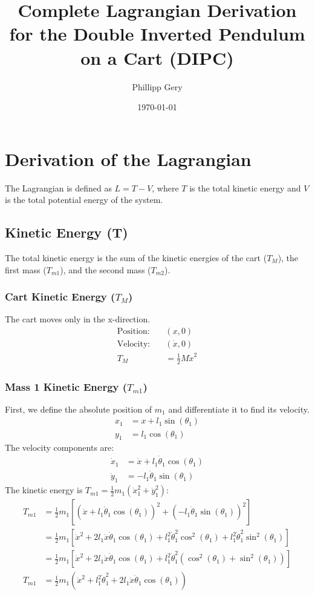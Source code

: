 \documentclass[12pt]{article}
\title{Complete Lagrangian Derivation for the Double Inverted Pendulum on a Cart (DIPC)}
\author{Phillipp Gery}
\date{\today}
\begin{document}
	
	\maketitle
	
	\section{Derivation of the Lagrangian}
	The Lagrangian is defined as $L = T - V$, where $T$ is the total kinetic energy and $V$ is the total potential energy of the system.
	
	\subsection{Kinetic Energy (T)}
	The total kinetic energy is the sum of the kinetic energies of the cart ($T_M$), the first mass ($T_{m1}$), and the second mass ($T_{m2}$).
	
	\subsubsection{Cart Kinetic Energy ($T_M$)}
	The cart moves only in the x-direction.
	\begin{align*}
		\text{Position:} \quad & (x, 0) \\
		\text{Velocity:} \quad & (\dot{x}, 0) \\
		T_M &= \frac{1}{2} M \dot{x}^2
	\end{align*}
	
	\subsubsection{Mass 1 Kinetic Energy ($T_{m1}$)}
	First, we define the absolute position of $m_1$ and differentiate it to find its velocity.
	\begin{align*}
		x_1 &= x + l_1 \sin(\theta_1) \\
		y_1 &= l_1 \cos(\theta_1)
	\end{align*}
	The velocity components are:
	\begin{align*}
		\dot{x}_1 &= \dot{x} + l_1 \dot{\theta}_1 \cos(\theta_1) \\
		\dot{y}_1 &= -l_1 \dot{\theta}_1 \sin(\theta_1)
	\end{align*}
	The kinetic energy is $T_{m1} = \frac{1}{2} m_1 (\dot{x}_1^2 + \dot{y}_1^2)$:
	\begin{align*}
		T_{m1} &= \frac{1}{2} m_1 \left[ (\dot{x} + l_1 \dot{\theta}_1 \cos(\theta_1))^2 + (-l_1 \dot{\theta}_1 \sin(\theta_1))^2 \right] \\
		&= \frac{1}{2} m_1 \left[ \dot{x}^2 + 2l_1\dot{x}\dot{\theta}_1\cos(\theta_1) + l_1^2\dot{\theta}_1^2\cos^2(\theta_1) + l_1^2\dot{\theta}_1^2\sin^2(\theta_1) \right] \\
		&= \frac{1}{2} m_1 \left[ \dot{x}^2 + 2l_1\dot{x}\dot{\theta}_1\cos(\theta_1) + l_1^2\dot{\theta}_1^2(\cos^2(\theta_1) + \sin^2(\theta_1)) \right] \\
		T_{m1} &= \frac{1}{2} m_1 (\dot{x}^2 + l_1^2 \dot{\theta}_1^2 + 2 l_1 \dot{x} \dot{\theta}_1 \cos(\theta_1))
	\end{align*}
	
\end{document}
